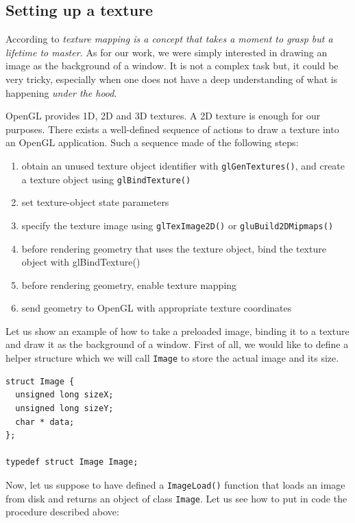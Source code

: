%
\subsection{Setting up a texture}
According to \cite{opengl:distilled} \textit{texture mapping 
is a concept that takes a moment to grasp but a lifetime 
to master.}
%
As for our work, we were simply interested in drawing an 
image as the background of a window. It is not a complex 
task but, it could be very tricky, especially when one 
does not have a deep understanding of what is happening 
\textit{under the hood}.
%

%
OpenGL provides 1D, 2D and 3D textures. A 2D texture is enough for our
purposes.
%
There exists a well-defined sequence of actions to draw a texture 
into an OpenGL application. Such a sequence made of the following steps:
\begin{enumerate}
\item obtain an unused texture object identifier with \texttt{glGenTextures()}, 
  and create a texture object using \texttt{glBindTexture()}
\item set texture-object state parameters
\item specify the texture image using \texttt{glTexImage2D()} 
  or \texttt{gluBuild2DMipmaps()}
\item before rendering geometry that uses the texture object, 
  bind the texture object with glBindTexture()
\item before rendering geometry, enable texture mapping
\item send geometry to OpenGL with appropriate texture 
  coordinates
\end{enumerate}
%
Let us show an example of how to take a preloaded image, binding it 
to a texture and draw it as the background of a window. First of all, 
we would like to define a helper structure which we will call \texttt{Image}
to store the actual image and its size.
%
\begin{lstlisting}[caption={The Image structure}, label={code:image}, frame=trBL]
struct Image {
  unsigned long sizeX;
  unsigned long sizeY;
  char * data;
};

typedef struct Image Image;
\end{lstlisting}
%
Now, let us suppose to have defined a \texttt{ImageLoad()} function 
that loads an image from disk and returns an object of class \texttt{Image}. 
Let us see how to put in code the procedure described above:
%
